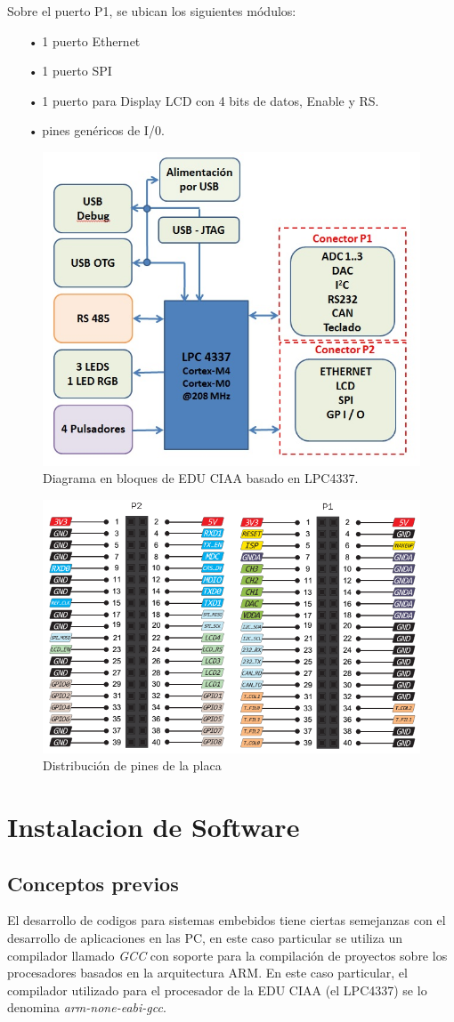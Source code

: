 \documentclass[12pt,letterpaper]{article}
\begin{document}
Sobre el puerto P1, se ubican los siguientes módulos:

\begin{enumerate}
\item[•] 1 puerto Ethernet
\item[•] 1 puerto SPI
\item[•] 1 puerto para Display LCD con 4 bits de datos, Enable y RS.
\item[•] pines genéricos de I/0.
\end{enumerate}


\begin{figure}[!h]
\centering
\includegraphics[width=8 cm]{figuras/diagramaenbloques.jpg}
\caption{Diagrama en bloques de EDU CIAA basado en LPC4337.}
\label{diagramaenbloques}
\end{figure}


\begin{figure}[h]
\centering
\includegraphics[width=8 cm]{figuras/f16.png}
\caption{Distribución de pines de la placa}
\label{distribucionpines}
\end{figure}

\section{Instalacion de Software}

\subsection{Conceptos previos}
El desarrollo de codigos para sistemas embebidos tiene ciertas semejanzas con el desarrollo de aplicaciones en las PC, en este caso particular se utiliza un compilador llamado \textit{GCC} con soporte para la compilación de proyectos sobre los procesadores basados en la arquitectura ARM. En este caso particular, el compilador utilizado para el procesador de la EDU CIAA (el LPC4337) se lo denomina \textit{arm-none-eabi-gcc}.
 \\
 
\end{document}
